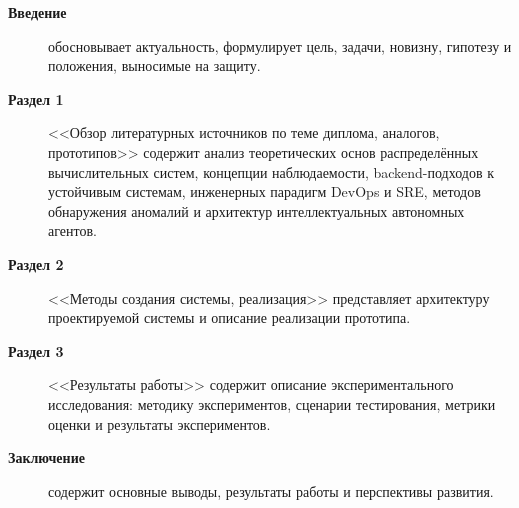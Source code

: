 \begin{description}
\item[\textbf{Введение}] обосновывает актуальность, формулирует цель, задачи, новизну, гипотезу и положения, выносимые на защиту.
\item[\textbf{Раздел 1}] <<Обзор литературных источников по теме диплома, аналогов, прототипов>> содержит анализ теоретических основ распределённых вычислительных систем, концепции наблюдаемости, backend-подходов к устойчивым системам, инженерных парадигм DevOps и SRE, методов обнаружения аномалий и архитектур интеллектуальных автономных агентов.
\item[\textbf{Раздел 2}] <<Методы создания системы, реализация>> представляет архитектуру проектируемой системы и описание реализации прототипа.
\item[\textbf{Раздел 3}] <<Результаты работы>> содержит описание экспериментального исследования: методику экспериментов, сценарии тестирования, метрики оценки и результаты экспериментов.
\item[\textbf{Заключение}] содержит основные выводы, результаты работы и перспективы развития.
\end{description}

